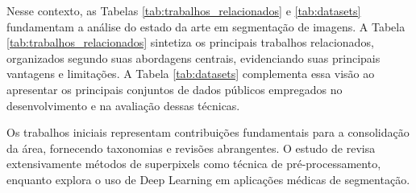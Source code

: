 Nesse contexto, as Tabelas \ref{tab:trabalhos_relacionados} e \ref{tab:datasets} fundamentam a análise do estado da arte em segmentação de imagens. A Tabela \ref{tab:trabalhos_relacionados} sintetiza os principais trabalhos relacionados, organizados segundo suas abordagens centrais, evidenciando suas principais vantagens e limitações. A Tabela \ref{tab:datasets} complementa essa visão ao apresentar os principais conjuntos de dados públicos empregados no desenvolvimento e na avaliação dessas técnicas.



Os trabalhos iniciais \cite{stutz2018superpixels, hesamian2020medical} representam contribuições fundamentais para a consolidação da área, fornecendo taxonomias e revisões abrangentes. O estudo de  revisa extensivamente métodos de superpixels como técnica de pré-processamento, enquanto  explora o uso de Deep Learning em aplicações médicas de segmentação.




